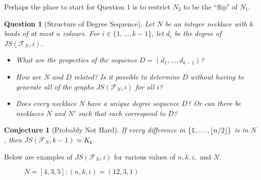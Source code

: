 \documentclass[12]{article}
\DeclarePairedDelimiter\floor{\lfloor}{\rfloor}
\newtheorem{question}{Question}
\newtheorem*{conjecture}{Conjecture}
\theoremstyle{definition}
\begin{document}
	Perhaps the place to start for Question 1 is to restrict $N_2$ to be the ``flip" of $N_1$.
	
	\begin{question}[Structure of Degree Sequence]
		Let $N$ be an integer necklace with $k$ beads of at most $n$ colours.  For $i \in \{1,\ldots,k-1\}$, let $d_i$ be the degree of $JS(\mathcal{F}_N,i)$.  
		\begin{itemize}
			\item What are the properties of the sequence $D = (d_1,\ldots,d_{k-1})$?
			\item How are $N$ and $D$ related?  Is it possible to determine $D$ without having to generate all of the graphs $JS(\mathcal{F}_N,i)$ for all $i$?
			\item Does every necklace $N$ have a unique degree sequence $D$?  Or can there be necklaces $N$ and $N'$ such that each correspond to $D$?
		\end{itemize}
		  
	\end{question}
	
	\begin{conjecture}[Probably Not Hard]
		If every difference in $\{1,\ldots,\floor{n/2}\}$ is in $N$, then $JS(\mathcal{F}_N,k-1) \simeq K_k$.
	\end{conjecture}
	
	Below are examples of $JS(\mathcal{F}_N,i)$ for various values of $n,k,i,$ and $N$.
	\newpage
	
\begin{figure}
	\begin{center}
	\end{center}
	\caption{$N = [4, 3, 5] ; (n,k,i) = ( 12 , 3 , 1 )$}
\end{figure}
	
\end{document}
